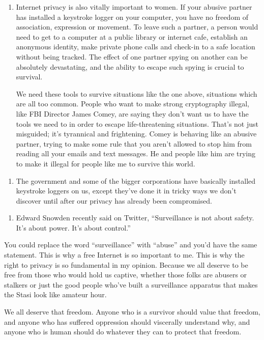 \begin{enumerate}
\def\labelenumi{\arabic{enumi}.}
\setcounter{enumi}{17}
\tightlist
\item
  Internet privacy is also vitally important to women. If your abusive
  partner has installed a keystroke logger on your computer, you have no
  freedom of association, expression or movement. To leave such a
  partner, a person would need to get to a computer at a public library
  or internet cafe, establish an anonymous identity, make private phone
  calls and check-in to a safe location without being tracked. The
  effect of one partner spying on another can be absolutely devastating,
  and the ability to escape such spying is crucial to survival.

  We need these tools to survive situations like the one above, situations
  which are all too common. People who want to make strong cryptography
  illegal, like FBI Director James Comey, are saying they don't want us to
  have the tools we need to in order to escape life-threatening
  situations. That's not just misguided; it's tyrannical and frightening.
  Comey is behaving like an abusive partner, trying to make some rule that
  you aren't allowed to stop him from reading all your emails and text
  messages. He and people like him are trying to make it illegal for
  people like me to survive this world.
\end{enumerate}

\begin{enumerate}
\def\labelenumi{\arabic{enumi}.}
\setcounter{enumi}{18}
\tightlist
\item
  The government and some of the bigger corporations have basically
  installed keystroke loggers on us, except they've done it in tricky
  ways we don't discover until after our privacy has already been
  compromised.
\end{enumerate}

\begin{enumerate}
\def\labelenumi{\arabic{enumi}.}
\setcounter{enumi}{19}
\tightlist
\item
  Edward Snowden recently said on Twitter, ``Surveillance is not about
  safety. It's about power. It's about control.''
\end{enumerate}

  You could replace the word ``surveillance'' with ``abuse'' and you'd
  have the same statement. This is why a free Internet is so important to
  me. This is why the right to privacy is so fundamental in my opinion.
  Because we all deserve to be free from those who would hold us captive,
  whether those folks are abusers or stalkers or just the good people
  who've built a surveillance apparatus that makes the Stasi look like
  amateur hour.

  We all deserve that freedom. Anyone who is a survivor should value that
  freedom, and anyone who has suffered oppression should viscerally
  understand why, and anyone who is human should do whatever they can to
  protect that freedom.
